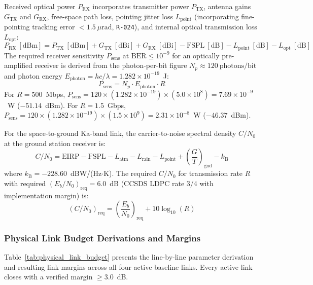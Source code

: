 Received optical power $P_{\text{RX}}$ incorporates transmitter power $P_{\text{TX}}$, antenna gains $G_{\text{TX}}$ and $G_{\text{RX}}$, free-space path loss, pointing jitter loss $L_{\text{point}}$ (incorporating fine-pointing tracking error $< 1.5~\mu\mathrm{rad}$, \texttt{R-024}), and internal optical transmission loss $L_{\text{opt}}$:
\begin{equation}
    P_{\text{RX}}~[\text{dBm}] = P_{\text{TX}}~[\text{dBm}] + G_{\text{TX}}~[\text{dBi}] + G_{\text{RX}}~[\text{dBi}] - \text{FSPL}~[\text{dB}] - L_{\text{point}}~[\text{dB}] - L_{\text{opt}}~[\text{dB}]
    \label{eq:prx_optical_calc}
\end{equation}
The required receiver sensitivity $P_{\text{sens}}$ at $\text{BER} \le 10^{-9}$ for an optically pre-amplified receiver is derived from the photon-per-bit figure $N_p \approx 120~\text{photons/bit}$ and photon energy $E_{\text{photon}} = hc/\lambda = 1.282 \times 10^{-19}$~J:
\begin{equation}
    P_{\text{sens}} = N_p \cdot E_{\text{photon}} \cdot R
\end{equation}
For $R = 500$~Mbps, $P_{\text{sens}} = 120 \times (1.282 \times 10^{-19}) \times (5.0 \times 10^8) = 7.69 \times 10^{-9}$~W ($-51.14$~dBm).
For $R = 1.5$~Gbps, $P_{\text{sens}} = 120 \times (1.282 \times 10^{-19}) \times (1.5 \times 10^9) = 2.31 \times 10^{-8}$~W ($-46.37$~dBm).

For the space-to-ground Ka-band  link, the carrier-to-noise spectral density $C/N_0$ at the ground station receiver is:
\begin{equation}
    C/N_0 = \text{EIRP} - \text{FSPL} - L_{\text{atm}} - L_{\text{rain}} - L_{\text{point}} + \left(\frac{G}{T}\right)_{\text{gnd}} - k_{\text{B}}
\end{equation}
where $k_{\text{B}} = -228.60$~dBW/(Hz$\cdot$K). The required $C/N_0$ for transmission rate $R$ with required $(E_b/N_0)_{\text{req}} = 6.0$~dB (CCSDS LDPC rate 3/4 with implementation margin) is:
\begin{equation}
    (C/N_0)_{\text{req}} = \left(\frac{E_b}{N_0}\right)_{\text{req}} + 10\log_{10}(R)
\end{equation}

\subsubsection{Physical Link Budget Derivations and Margins}

Table~\ref{tab:physical_link_budget} presents the line-by-line parameter derivation and resulting link margins across all four active baseline links. Every active link closes with a verified margin $\ge 3.0$~dB.

